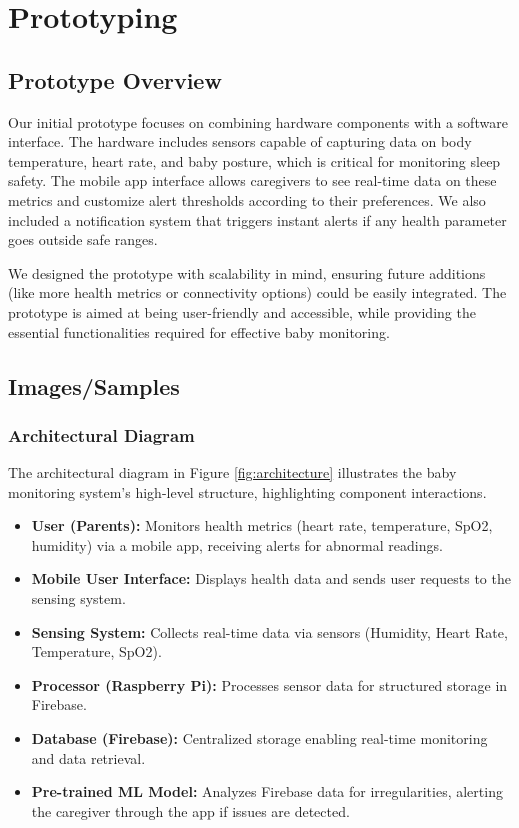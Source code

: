 \documentclass[12pt,a4paper]{report}
\begin{document}
\chapter{Prototyping}
\section{Prototype Overview}
Our initial prototype focuses on combining hardware components with a software interface. The hardware includes sensors capable of capturing data on body temperature, heart rate, and baby posture, which is critical for monitoring sleep safety. The mobile app interface allows caregivers to see real-time data on these metrics and customize alert thresholds according to their preferences. We also included a notification system that triggers instant alerts if any health parameter goes outside safe ranges.

We designed the prototype with scalability in mind, ensuring future additions (like more health metrics or connectivity options) could be easily integrated. The prototype is aimed at being user-friendly and accessible, while providing the essential functionalities required for effective baby monitoring.

\section{Images/Samples}
\subsection{Architectural Diagram}
The architectural diagram in Figure \ref{fig:architecture} illustrates the baby monitoring system's high-level structure, highlighting component interactions.

\begin{itemize}
  \item \textbf{User (Parents):} Monitors health metrics (heart rate, temperature, SpO2, humidity) via a mobile app, receiving alerts for abnormal readings.
  \item \textbf{Mobile User Interface:} Displays health data and sends user requests to the sensing system.
  \item \textbf{Sensing System:} Collects real-time data via sensors (Humidity, Heart Rate, Temperature, SpO2).
  \item \textbf{Processor (Raspberry Pi):} Processes sensor data for structured storage in Firebase.
  \item \textbf{Database (Firebase):} Centralized storage enabling real-time monitoring and data retrieval.
  \item \textbf{Pre-trained ML Model:} Analyzes Firebase data for irregularities, alerting the caregiver through the app if issues are detected.
\end{itemize}
\end{document}
